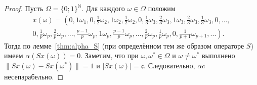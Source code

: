 \begin{proof}
	Пусть $\Omega = \{0;1\}^{\mathbb{N}}$.
	Для каждого $\omega\in\Omega$ положим
	\begin{multline}
		x(\omega)=\left(
			0, 1\omega_1,
			0, \frac{1}{2}\omega_2, 1\omega_2, \frac{1}{2}\omega_2,
			0, \frac{1}{3}\omega_3, \frac{2}{3}\omega_3, 1\omega_3, \frac{2}{3}\omega_3, \frac{1}{3}\omega_3,
			0, ...,
		\right. \\ \left.
			0, \frac{1}{p}\omega_p, \frac{2}{p}\omega_p, ..., \frac{p-1}{p}\omega_p, 1\omega_p,
				\frac{p-1}{p}\omega_p, ..., \frac{2}{p}\omega_p, \frac{1}{p}\omega_p,
			0, \frac{1}{p+1}\omega_{p+1}, ...
		\right).
	\end{multline}
	Тогда по лемме~\ref{thm:alpha_S} (при определённом тем же образом операторе $S$) имеем
	$\alpha(Sx(\omega)) = 0$.
	Заметим, что при $\omega,\omega^* \in \Omega$ и $\omega\neq\omega^*$ выполнено
	$\|Sx(\omega)-Sx(\omega^*)\|=1$ и $|Sx(\omega)|=\mathfrak{c}$.
	Следовательно, $\alpha c$ несепарабельно.
\end{proof}
